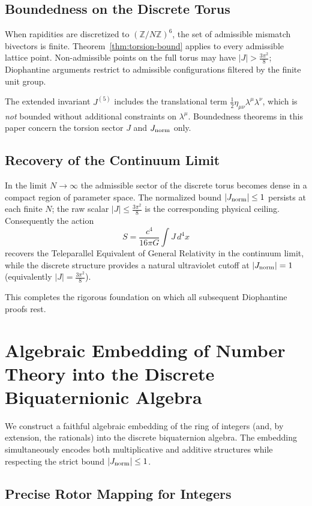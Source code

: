 \documentclass[dvipdfmx,a4paper]{article}
\theoremstyle{definition}
\theoremstyle{remark}
\newcommand{\Jnorm}{J_{\rm norm}}
\newcommand{\Jbound}{\frac{3\pi^2}{8}}
\begin{document}
\subsection{Boundedness on the Discrete Torus}

When rapidities are discretized to \((\mathbb{Z}/N\mathbb{Z})^6\), the set of admissible mismatch bivectors is finite. Theorem~\ref{thm:torsion-bound} applies to every admissible lattice point. Non-admissible points on the full torus may have \(|J| > \Jbound\); Diophantine arguments restrict to admissible configurations filtered by the finite unit group.

The extended invariant \(J^{(5)}\) includes the translational term \(\frac12 \eta_{\mu\nu}\lambda^\mu\lambda^\nu\), which is \emph{not} bounded without additional constraints on \(\lambda^\mu\). Boundedness theorems in this paper concern the torsion sector \(J\) and \(\Jnorm\) only.

\subsection{Recovery of the Continuum Limit}

In the limit \( N \to \infty \) the admissible sector of the discrete torus becomes dense in a compact region of parameter space. The normalized bound \(|\Jnorm| \leq 1\) persists at each finite \(N\); the raw scalar \(|J| \leq \Jbound\) is the corresponding physical ceiling. Consequently the action
\[
S = \frac{c^4}{16\pi G} \int J \, d^4x
\]
recovers the Teleparallel Equivalent of General Relativity in the continuum limit, while the discrete structure provides a natural ultraviolet cutoff at \(|\Jnorm| = 1\) (equivalently \(|J| = \Jbound\)).

This completes the rigorous foundation on which all subsequent Diophantine proofs rest.

\section{Algebraic Embedding of Number Theory into the Discrete Biquaternionic Algebra}

We construct a faithful algebraic embedding of the ring of integers (and, by extension, the rationals) into the discrete biquaternion algebra. The embedding simultaneously encodes both multiplicative and additive structures while respecting the strict bound \( |\Jnorm| \leq 1 \).

\subsection{Precise Rotor Mapping for Integers}
\end{document}
